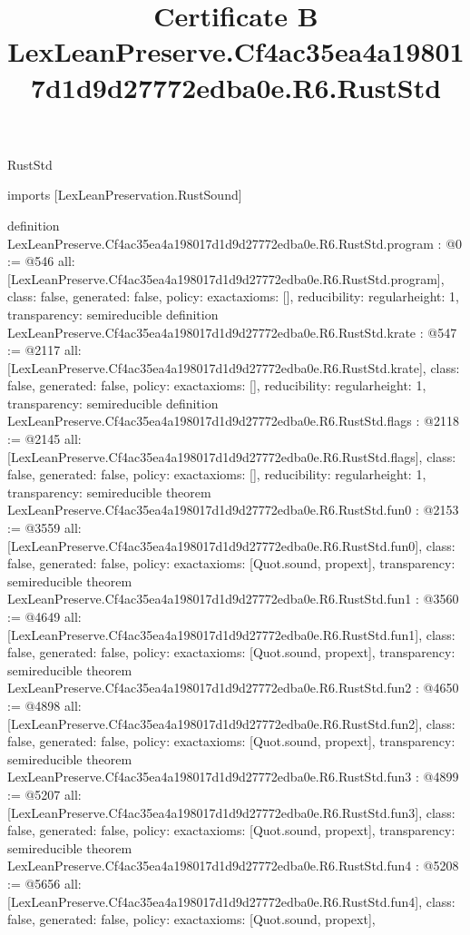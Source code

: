 \begin{lexlean}{RustStd}
\title{Certificate B LexLeanPreserve.Cf4ac35ea4a198017d1d9d27772edba0e.R6.RustStd}
\begin{coremodule}
imports [LexLeanPreservation.RustSound]

definition LexLeanPreserve.Cf4ac35ea4a198017d1d9d27772edba0e.R6.RustStd.program : @0 := @546 {
  all: [LexLeanPreserve.Cf4ac35ea4a198017d1d9d27772edba0e.R6.RustStd.program],
  class: false,
  generated: false,
  policy: exact{axioms: []},
  reducibility: regular{height: 1},
  transparency: semireducible
}
definition LexLeanPreserve.Cf4ac35ea4a198017d1d9d27772edba0e.R6.RustStd.krate : @547 := @2117 {
  all: [LexLeanPreserve.Cf4ac35ea4a198017d1d9d27772edba0e.R6.RustStd.krate],
  class: false,
  generated: false,
  policy: exact{axioms: []},
  reducibility: regular{height: 1},
  transparency: semireducible
}
definition LexLeanPreserve.Cf4ac35ea4a198017d1d9d27772edba0e.R6.RustStd.flags : @2118 := @2145 {
  all: [LexLeanPreserve.Cf4ac35ea4a198017d1d9d27772edba0e.R6.RustStd.flags],
  class: false,
  generated: false,
  policy: exact{axioms: []},
  reducibility: regular{height: 1},
  transparency: semireducible
}
theorem LexLeanPreserve.Cf4ac35ea4a198017d1d9d27772edba0e.R6.RustStd.fun0 : @2153 := @3559 {
  all: [LexLeanPreserve.Cf4ac35ea4a198017d1d9d27772edba0e.R6.RustStd.fun0],
  class: false,
  generated: false,
  policy: exact{axioms: [Quot.sound, propext]},
  transparency: semireducible
}
theorem LexLeanPreserve.Cf4ac35ea4a198017d1d9d27772edba0e.R6.RustStd.fun1 : @3560 := @4649 {
  all: [LexLeanPreserve.Cf4ac35ea4a198017d1d9d27772edba0e.R6.RustStd.fun1],
  class: false,
  generated: false,
  policy: exact{axioms: [Quot.sound, propext]},
  transparency: semireducible
}
theorem LexLeanPreserve.Cf4ac35ea4a198017d1d9d27772edba0e.R6.RustStd.fun2 : @4650 := @4898 {
  all: [LexLeanPreserve.Cf4ac35ea4a198017d1d9d27772edba0e.R6.RustStd.fun2],
  class: false,
  generated: false,
  policy: exact{axioms: [Quot.sound, propext]},
  transparency: semireducible
}
theorem LexLeanPreserve.Cf4ac35ea4a198017d1d9d27772edba0e.R6.RustStd.fun3 : @4899 := @5207 {
  all: [LexLeanPreserve.Cf4ac35ea4a198017d1d9d27772edba0e.R6.RustStd.fun3],
  class: false,
  generated: false,
  policy: exact{axioms: [Quot.sound, propext]},
  transparency: semireducible
}
theorem LexLeanPreserve.Cf4ac35ea4a198017d1d9d27772edba0e.R6.RustStd.fun4 : @5208 := @5656 {
  all: [LexLeanPreserve.Cf4ac35ea4a198017d1d9d27772edba0e.R6.RustStd.fun4],
  class: false,
  generated: false,
  policy: exact{axioms: [Quot.sound, propext]},
}
\end{coremodule}
\end{lexlean}
